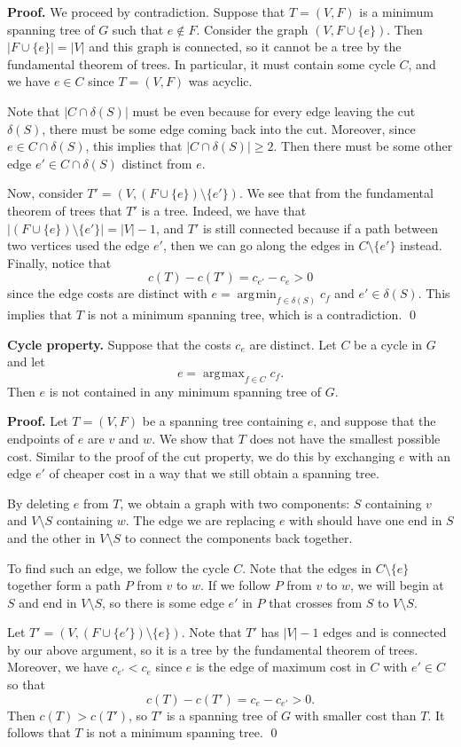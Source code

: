 \documentclass{article}
\DeclareMathOperator*{\argmin}{\arg\!\min}
\DeclareMathOperator*{\argmax}{\arg\!\max}
\begin{document}
{\color{blue}
{\bf Proof.} We proceed by contradiction. Suppose that $T = (V, F)$ 
is a minimum spanning tree of $G$ such that $e \notin F$. Consider the 
graph $(V, F \cup \{e\})$. Then $|F \cup \{e\}| = |V|$ and this graph 
is connected, so it cannot be a tree by the fundamental theorem of trees. In 
particular, it must contain some cycle $C$, and we have $e \in C$ since 
$T = (V, F)$ was acyclic.

Note that $|C \cap \delta(S)|$ must be even because for every edge 
leaving the cut $\delta(S)$, there must be some edge coming back into the cut. 
Moreover, since $e \in C \cap \delta(S)$, this implies that 
$|C \cap \delta(S)| \geq 2$. Then there must be some other edge 
$e' \in C \cap \delta(S)$ distinct from $e$.

Now, consider $T' = (V, (F \cup \{e\}) \setminus \{e'\})$. We see that 
from the fundamental theorem of trees that $T'$ is a tree. Indeed, we 
have that $|(F \cup \{e\}) \setminus \{e'\}| = |V| - 1$, and $T'$ is still 
connected because if a path between two vertices used the edge 
$e'$, then we can go along the edges in $C \setminus \{e'\}$ instead. 
Finally, notice that 
\[ c(T) - c(T') = c_{e'} - c_e > 0 \] 
since the edge costs are distinct with $e = \argmin_{f\in\delta(S)} c_f$ 
and $e' \in \delta(S)$. This implies that $T$
is not a minimum spanning tree, which is a contradiction. \qed}

{\color{violet}
{\bf Cycle property.} Suppose that the costs $c_e$ are distinct. 
Let $C$ be a cycle in $G$ and let 
\[ e = \argmax_{f \in C} c_f. \]
Then $e$ is not contained in any minimum spanning tree of $G$.}

{\color{blue}
{\bf Proof.} Let $T = (V, F)$ be a spanning tree containing $e$, 
and suppose that the endpoints of $e$ are $v$ and $w$. We show that $T$ 
does not have the smallest possible cost. Similar to the proof of the 
cut property, we do this by exchanging $e$ with an edge $e'$ 
of cheaper cost in a way that we still obtain a spanning tree. 

By deleting $e$ from $T$, we obtain a graph with two components: $S$ 
containing $v$ and $V \setminus S$ containing $w$. The edge we are 
replacing $e$ with should have one end in $S$ and the other in $V \setminus S$ 
to connect the components back together. 

To find such an edge, we follow the cycle $C$. Note that the edges in 
$C \setminus \{e\}$ together form a path $P$ from $v$ to $w$. If 
we follow $P$ from $v$ to $w$, we will begin at $S$ and end in $V \setminus S$, 
so there is some edge $e'$ in $P$ that crosses from $S$ to $V \setminus S$. 

Let $T' = (V, (F \cup \{e'\}) \setminus \{e\})$. Note that $T'$ 
has $|V| - 1$ edges and is connected by our above argument, so it is a tree 
by the fundamental theorem of trees. Moreover, we have $c_{e'} < c_e$ 
since $e$ is the edge of maximum cost in $C$ with $e' \in C$ so that 
\[ c(T) - c(T') = c_e - c_{e'} > 0. \] 
Then $c(T) > c(T')$, so $T'$ is a spanning tree of $G$ with smaller cost 
than $T$. It follows that $T$ is not a minimum spanning tree. \qed}
\end{document}

